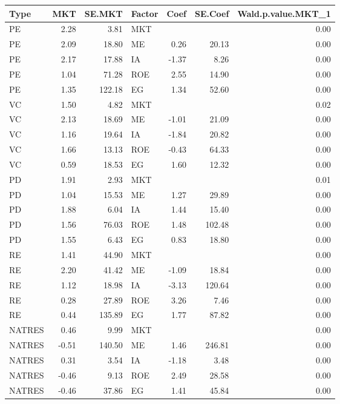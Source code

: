 \documentclass[12pt]{article}
\begin{document}
\begin{table}[ht]
	\centering
	\begin{tabular}{lrrlrrr}
		Type & MKT & SE.MKT & Factor & Coef & SE.Coef & Wald.p.value.MKT\_1 \\ 
		\hline
		\hline
		PE & 2.28 & 3.81 & MKT &  &  & 0.00 \\ 
		PE & 2.09 & 18.80 & ME & 0.26 & 20.13 & 0.00 \\ 
		PE & 2.17 & 17.88 & IA & -1.37 & 8.26 & 0.00 \\ 
		PE & 1.04 & 71.28 & ROE & 2.55 & 14.90 & 0.00 \\ 
		PE & 1.35 & 122.18 & EG & 1.34 & 52.60 & 0.00 \\ 
		\hline
		VC & 1.50 & 4.82 & MKT &  &  & 0.02 \\ 
		VC & 2.13 & 18.69 & ME & -1.01 & 21.09 & 0.00 \\ 
		VC & 1.16 & 19.64 & IA & -1.84 & 20.82 & 0.00 \\ 
		VC & 1.66 & 13.13 & ROE & -0.43 & 64.33 & 0.00 \\ 
		VC & 0.59 & 18.53 & EG & 1.60 & 12.32 & 0.00 \\ 
		\hline
		PD & 1.91 & 2.93 & MKT &  &  & 0.01 \\ 
		PD & 1.04 & 15.53 & ME & 1.27 & 29.89 & 0.00 \\ 
		PD & 1.88 & 6.04 & IA & 1.44 & 15.40 & 0.00 \\ 
		PD & 1.56 & 76.03 & ROE & 1.48 & 102.48 & 0.00 \\ 
		PD & 1.55 & 6.43 & EG & 0.83 & 18.80 & 0.00 \\ 
		\hline
		RE & 1.41 & 44.90 & MKT &  &  & 0.00 \\ 
		RE & 2.20 & 41.42 & ME & -1.09 & 18.84 & 0.00 \\ 
		RE & 1.12 & 18.98 & IA & -3.13 & 120.64 & 0.00 \\ 
		RE & 0.28 & 27.89 & ROE & 3.26 & 7.46 & 0.00 \\ 
		RE & 0.44 & 135.89 & EG & 1.77 & 87.82 & 0.00 \\ 
		\hline
		NATRES & 0.46 & 9.99 & MKT &  &  & 0.00 \\ 
		NATRES & -0.51 & 140.50 & ME & 1.46 & 246.81 & 0.00 \\ 
		NATRES & 0.31 & 3.54 & IA & -1.18 & 3.48 & 0.00 \\ 
		NATRES & -0.46 & 9.13 & ROE & 2.49 & 28.58 & 0.00 \\ 
		NATRES & -0.46 & 37.86 & EG & 1.41 & 45.84 & 0.00 \\ 

\end{tabular}
\end{table}
\end{document}
